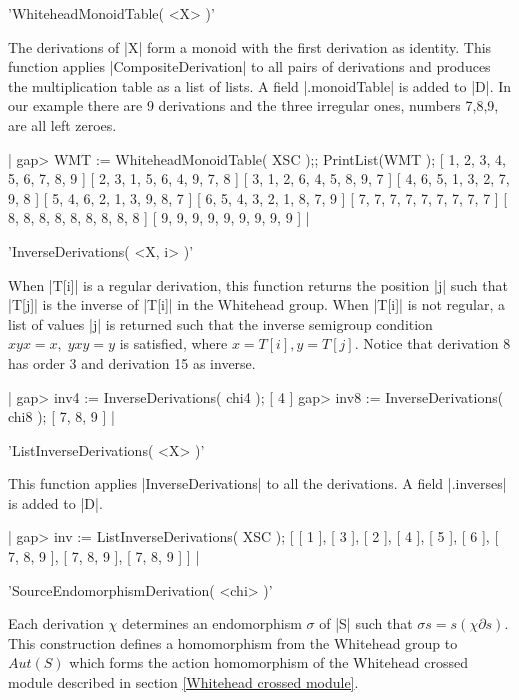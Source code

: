{'WhiteheadMonoidTable( <X> )'

The derivations of |X| form a monoid with the first derivation as identity.
This function applies |CompositeDerivation| to all pairs of derivations
and produces the multiplication table as a list of lists.
A field |.monoidTable| is added to |D|.
In our example there are 9 derivations and the three irregular ones,
numbers 7,8,9, are all left zeroes.

|    gap> WMT := WhiteheadMonoidTable( XSC );; PrintList(WMT );
    [ 1, 2, 3, 4, 5, 6, 7, 8, 9 ]
    [ 2, 3, 1, 5, 6, 4, 9, 7, 8 ]
    [ 3, 1, 2, 6, 4, 5, 8, 9, 7 ]
    [ 4, 6, 5, 1, 3, 2, 7, 9, 8 ]
    [ 5, 4, 6, 2, 1, 3, 9, 8, 7 ]
    [ 6, 5, 4, 3, 2, 1, 8, 7, 9 ]
    [ 7, 7, 7, 7, 7, 7, 7, 7, 7 ]
    [ 8, 8, 8, 8, 8, 8, 8, 8, 8 ]
    [ 9, 9, 9, 9, 9, 9, 9, 9, 9 ]  |

%

'InverseDerivations( <X, i> )'

When |T[i]| is a regular derivation,
this function returns the position |j| such that |T[j]|
is the inverse of |T[i]| in the Whitehead group.
When |T[i]| is not regular, a list of values |j| is returned
such that the inverse semigroup condition
$xyx = x, \; yxy = y$  is satisfied, where  $x = T[i], y = T[j]$.
Notice that derivation 8 has order 3 and derivation 15 as inverse.

|    gap> inv4 := InverseDerivations( chi4 );
    [ 4 ]
    gap> inv8 := InverseDerivations( chi8 );
    [ 7, 8, 9 ]   |

%

'ListInverseDerivations( <X> )'

This function applies |InverseDerivations| to all the derivations.
A field |.inverses| is added to |D|.

|    gap> inv := ListInverseDerivations( XSC );
    [ [ 1 ], [ 3 ], [ 2 ], [ 4 ], [ 5 ], [ 6 ],
      [ 7, 8, 9 ], [ 7, 8, 9 ], [ 7, 8, 9 ] ]    |

%

'SourceEndomorphismDerivation( <chi> )'

Each derivation $\chi$ determines an endomorphism  $\sigma$  of |S| 
such that  $\sigma s = s (\chi \partial s)$.
This construction defines a homomorphism from the
Whitehead group to $Aut(S)$ which forms the action homomorphism
of the Whitehead crossed module described in section  
\ref{Whitehead crossed module}.

}
